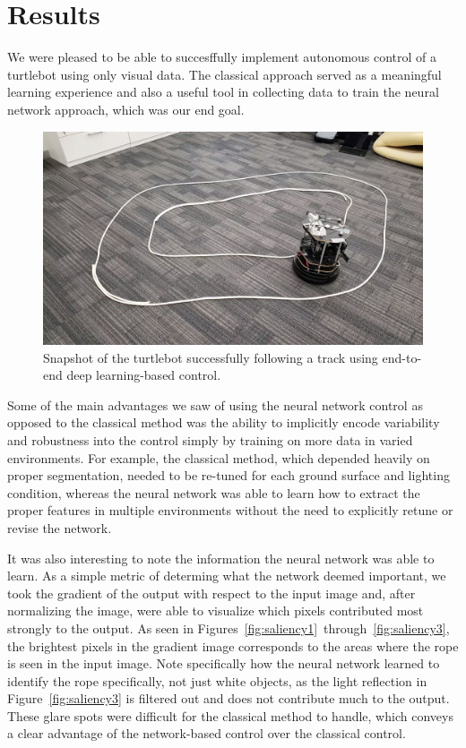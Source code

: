 \section{Results}
\label{sec:results}

We were pleased to be able to succesffully implement autonomous control of a turtlebot using only visual data. The classical approach served as a meaningful learning experience and also a useful tool in collecting data to train the neural network approach, which was our end goal.

\begin{figure}[hbt]
  \includegraphics[width=\columnwidth]{figures/success_track}
  \caption{Snapshot of the turtlebot successfully following a track using end-to-end deep learning-based control.}
  \label{fig:success_track}
\end{figure}

Some of the main advantages we saw of using the neural network control as opposed to the classical method was the ability to implicitly encode variability and robustness into the control simply by training on more data in varied environments. For example, the classical method, which depended heavily on proper segmentation, needed to be re-tuned for each ground surface and lighting condition, whereas the neural network was able to learn how to extract the proper features in multiple environments without the need to explicitly retune or revise the network.

It was also interesting to note the information the neural network was able to learn. As a simple metric of determing what the network deemed important, we took the gradient of the output with respect to the input image and, after normalizing the image, were able to visualize which pixels contributed most strongly to the output. As seen in Figures~\ref{fig:saliency1}~through~\ref{fig:saliency3}, the brightest pixels in the gradient image corresponds to the areas where the rope is seen in the input image. Note specifically how the neural network learned to identify the rope specifically, not just white objects, as the light reflection in Figure~\ref{fig:saliency3} is filtered out and does not contribute much to the output. These glare spots were difficult for the classical method to handle, which conveys a clear advantage of the network-based control over the classical control.


